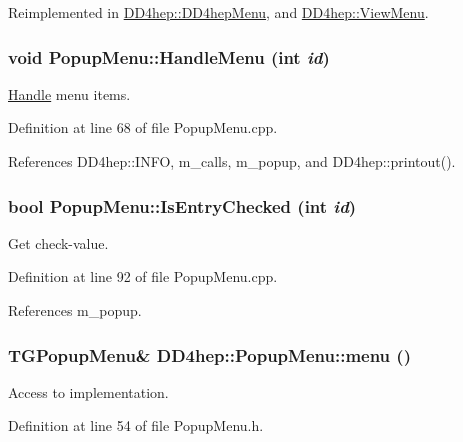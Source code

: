 Reimplemented in \hyperlink{class_d_d4hep_1_1_d_d4hep_menu_af3b9cf3c445924532b16883e46833624}{DD4hep::DD4hepMenu}, and \hyperlink{class_d_d4hep_1_1_view_menu_ae114589d23508b5e814581c6b198858b}{DD4hep::ViewMenu}.\hypertarget{class_d_d4hep_1_1_popup_menu_a8f5895d41102d89191fae441522cc53c}{
\subsubsection[{HandleMenu}]{\setlength{\rightskip}{0pt plus 5cm}void PopupMenu::HandleMenu (int {\em id})}}
\label{class_d_d4hep_1_1_popup_menu_a8f5895d41102d89191fae441522cc53c}


\hyperlink{class_d_d4hep_1_1_handle}{Handle} menu items. 

Definition at line 68 of file PopupMenu.cpp.

References DD4hep::INFO, m\_\-calls, m\_\-popup, and DD4hep::printout().\hypertarget{class_d_d4hep_1_1_popup_menu_ae1fcd8933b7dbff53327cfb1f13d00d4}{
\subsubsection[{IsEntryChecked}]{\setlength{\rightskip}{0pt plus 5cm}bool PopupMenu::IsEntryChecked (int {\em id})}}
\label{class_d_d4hep_1_1_popup_menu_ae1fcd8933b7dbff53327cfb1f13d00d4}


Get check-\/value. 

Definition at line 92 of file PopupMenu.cpp.

References m\_\-popup.\hypertarget{class_d_d4hep_1_1_popup_menu_a3142e910b19e33ac04e9e260cb8981be}{
\subsubsection[{menu}]{\setlength{\rightskip}{0pt plus 5cm}TGPopupMenu\& DD4hep::PopupMenu::menu ()}}
\label{class_d_d4hep_1_1_popup_menu_a3142e910b19e33ac04e9e260cb8981be}


Access to implementation. 

Definition at line 54 of file PopupMenu.h.

